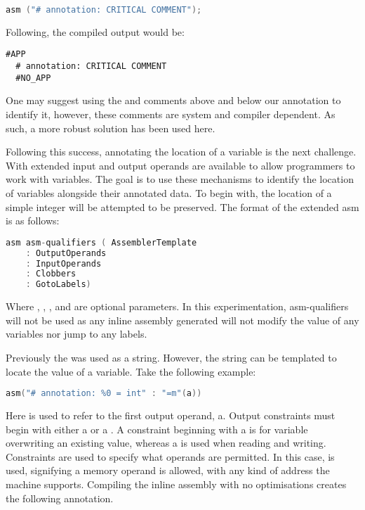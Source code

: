 \begin{lstlisting}[firstnumber=2, language=C]
    asm ("# annotation: CRITICAL COMMENT");
\end{lstlisting}

Following, the compiled output would be:
\begin{lstlisting}[firstnumber=15]
  #APP
  # annotation: CRITICAL COMMENT
  #NO_APP
\end{lstlisting}

One may suggest using the  and  comments above and below our annotation to identify it, however, these comments are system and compiler dependent. As such, a more robust solution has been used here.

Following this success, annotating the location of a variable is the next challenge. With extended  input and output operands are available to allow programmers to work with variables. The goal is to use these mechanisms to identify the location of variables alongside their annotated data. To begin with, the location of a simple integer will be attempted to be preserved. The format of the extended asm is as follows:

\begin{lstlisting}[language=C, numbers=none]
asm asm-qualifiers ( AssemblerTemplate 
    : OutputOperands
    : InputOperands
    : Clobbers
    : GotoLabels)
\end{lstlisting}

Where , , ,  and  are optional parameters. In this experimentation, asm-qualifiers will not be used as any inline assembly generated will not modify the value of any variables nor jump to any labels.

Previously the  was used as a string. However, the string can be templated to locate the value of a variable. Take the following example:

\begin{lstlisting}[language=C, numbers=none]
asm("# annotation: %0 = int" : "=m"(a))
\end{lstlisting}

Here  is used to refer to the first output operand, a. Output constraints must begin with either a  or a . A constraint beginning with a  is for variable overwriting an existing value, whereas a  is used when reading and writing. Constraints are used to specify what operands are permitted. In this case,  is used, signifying a memory operand is allowed, with any kind of address the machine supports. Compiling the inline assembly with no optimisations creates the following annotation.

